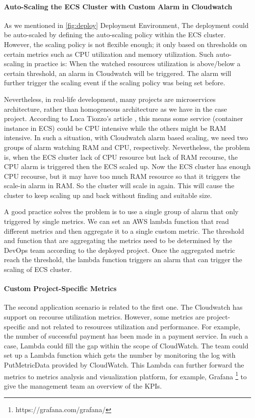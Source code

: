 \paragraph[]{Auto-Scaling the ECS Cluster with Custom Alarm in Cloudwatch}
As we mentioned in \ref{fig:deploy} Deployment Environment, The deployment could be auto-scaled by defining the auto-scaling policy within the ECS cluster. However, the scaling policy is not flexible enough; it only based on thresholds on certain metrics such as CPU utilization and memory utilization. Such auto-scaling in practice is: When the watched resources utilization is above/below a certain threshold, an alarm in Cloudwatch will be triggered. The alarm will further trigger the scaling event if the scaling policy was being set before.
\par
Nevertheless, in real-life development, many projects are microservices architecture, rather than homogeneous architecture as we have in the case project. According to Luca Tiozzo's article \cite{AWSECSho47:online}, this means some service (container instance in ECS) could be CPU intensive while the others might be RAM intensive. In such a situation, with Cloudwatch alarm based scaling, we need two groups of alarm watching RAM and CPU, respectively. Nevertheless, the problem is, when the ECS cluster lack of CPU resource but lack of RAM recourse, the CPU alarm is triggered then the ECS scaled up. Now the ECS cluster has enough CPU recourse, but it may have too much RAM resource so that it triggers the scale-in alarm in RAM. So the cluster will scale in again. This will cause the cluster to keep scaling up and back without finding and suitable size.
\par
A good practice solves the problem is to use a single group of alarm that only triggered by single metrics. We can set an AWS lambda function that read different metrics and then aggregate it to a single custom metric. The threshold and function that are aggregating the metrics need to be determined by the DevOps team according to the deployed project. Once the aggregated metric reach the threshold, the lambda function triggers an alarm that can trigger the scaling of ECS cluster. 
\paragraph[]{Custom Project-Specific Metrics}
The second application scenario is related to the first one. The Cloudwatch has support on recourse utilization metrics. However, some metrics are project-specific and not related to resources utilization and performance. For example, the number of successful payment has been made in a payment service. In such a case, Lambda could fill the gap within the scope of CloudWatch. The team could set up a Lambda function which gets the number by monitoring the log with PutMetricData provided by CloudWatch. This Lambda can further forward the metrics to metrics analysis and visualization platform, for example, Grafana \footnote{https://grafana.com/grafana/} to give the management team an overview of the KPIs.
